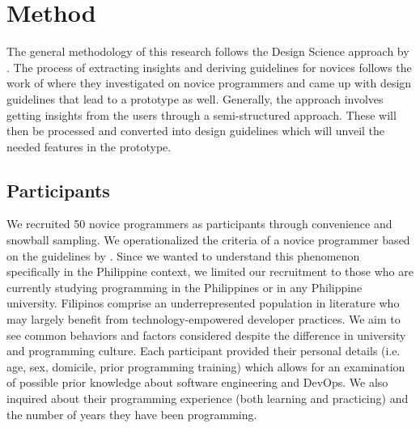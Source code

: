 \documentclass{sigchi}
\begin{document}

\section{Method}
The general methodology of this research follows the Design Science approach by \cite{peffers2007design}. The process of extracting insights and deriving guidelines for novices follows the work of \cite{nodalo2019building} where they investigated on novice programmers and came up with design guidelines that lead to a prototype as well. Generally, the approach involves getting insights from the users through a semi-structured approach. These will then be processed and converted into design guidelines which will unveil the needed features in the prototype. 
\subsection{Participants}
We recruited 50 novice programmers as participants through convenience and snowball sampling. We operationalized the criteria of a novice programmer based on the guidelines by \cite{teague2014longitudinal}. Since we wanted to understand this phenomenon specifically in the Philippine context, we limited our recruitment to those who are currently studying programming in the Philippines or in any Philippine university. Filipinos comprise an underrepresented population in literature who may largely benefit from technology-empowered developer practices. We aim to see common behaviors and factors considered despite the difference in university and programming culture. Each participant provided their personal details (i.e. age, sex, domicile, prior programming training) which allows for an examination of possible prior knowledge about software engineering and DevOps. We also inquired about their programming experience (both learning and practicing) and the number of years they have been programming. 
\end{document}
